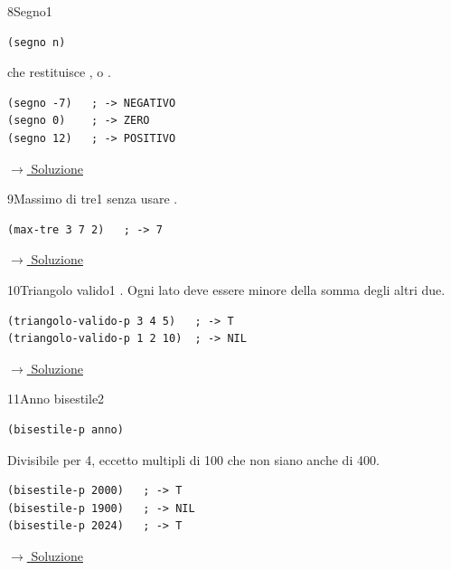 \label{ex:8}
\begin{essbox}{8}{Segno}{1}
\nopagebreak
\begin{lstlisting}
(segno n)
\end{lstlisting}
che restituisce ,  o .
\begin{lstlisting}
(segno -7)   ; -> NEGATIVO
(segno 0)    ; -> ZERO
(segno 12)   ; -> POSITIVO
\end{lstlisting}


\small\color{black!55}\hyperref[sol:8]{$\rightarrow$ Soluzione}\normalsize\color{black}
\end{essbox}

\label{ex:9}
\begin{stdbox}{9}{Massimo di tre}{1}
  senza usare .
\nopagebreak
\begin{lstlisting}
(max-tre 3 7 2)   ; -> 7
\end{lstlisting}


\small\color{black!55}\hyperref[sol:9]{$\rightarrow$ Soluzione}\normalsize\color{black}
\end{stdbox}

\label{ex:10}
\begin{colbox}{10}{Triangolo valido}{1}
 .
Ogni lato deve essere minore della somma degli altri due.
\begin{lstlisting}
(triangolo-valido-p 3 4 5)   ; -> T
(triangolo-valido-p 1 2 10)  ; -> NIL
\end{lstlisting}


\small\color{black!55}\hyperref[sol:10]{$\rightarrow$ Soluzione}\normalsize\color{black}
\end{colbox}

\label{ex:11}
\begin{essbox}{11}{Anno bisestile}{2}
\nopagebreak
\begin{lstlisting}
(bisestile-p anno)
\end{lstlisting}
Divisibile per 4, eccetto multipli di 100 che non siano anche di 400.
\begin{lstlisting}
(bisestile-p 2000)   ; -> T
(bisestile-p 1900)   ; -> NIL
(bisestile-p 2024)   ; -> T
\end{lstlisting}


\small\color{black!55}\hyperref[sol:11]{$\rightarrow$ Soluzione}\normalsize\color{black}
\end{essbox}

